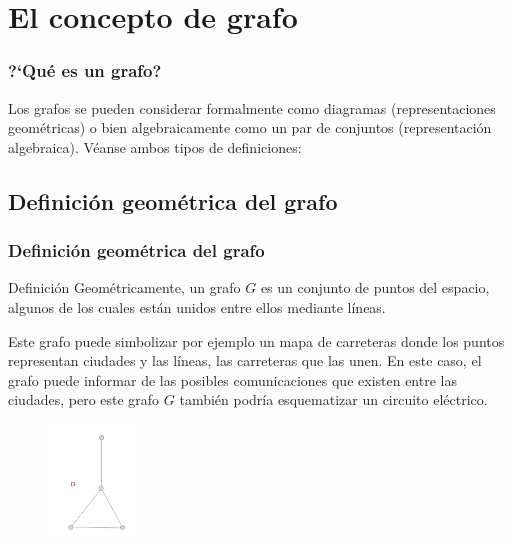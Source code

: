 \documentclass{beamer}
\begin{document}
\section{El concepto de grafo}


\begin{frame}
\frametitle{?`Qu\'e es un grafo?}
Los grafos se pueden considerar formalmente como diagramas (representaciones geom\'etricas) o bien algebraicamente como un par de conjuntos (representaci\'on algebraica). V\'eanse ambos tipos de definiciones:
\end{frame}

\subsection{Definici\'on geom\'etrica del grafo}
\begin{frame}
\frametitle{Definici\'on geom\'etrica del grafo}
\begin{block}{Definici\'on}
Geom\'etricamente, un grafo $G$ es un conjunto de puntos del espacio, algunos de los cuales est\'an unidos entre ellos mediante l\'ineas. 
\end{block}
Este grafo puede simbolizar por ejemplo un mapa de carreteras donde los puntos representan ciudades y las l\'ineas, las carreteras que las unen. En este caso, el grafo puede informar de las posibles comunicaciones que existen entre las ciudades, pero este grafo $G$ tambi\'en podr\'ia esquematizar un circuito el\'ectrico. 

\begin{figure}[h]
 \label{fig:volumen}
\centering
\includegraphics[height=3cm]{g1}
\end{figure}\end{frame}
\end{document}
